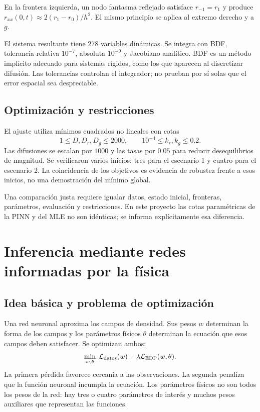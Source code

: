\documentclass[11pt,a4paper]{report}
\begin{document}
En la frontera izquierda, un nodo fantasma reflejado satisface $r_{-1}=r_1$ y produce $r_{xx}(0,t)\approx2(r_1-r_0)/h^2$. El mismo principio se aplica al extremo derecho y a $g$.

El sistema resultante tiene $278$ variables dinámicas. Se integra con BDF, tolerancia relativa $10^{-7}$, absoluta $10^{-9}$ y Jacobiano analítico. BDF es un método implícito adecuado para sistemas rígidos, como los que aparecen al discretizar difusión. Las tolerancias controlan el integrador; no prueban por sí solas que el error espacial sea despreciable.

\section{Optimización y restricciones}
El ajuste utiliza mínimos cuadrados no lineales con cotas
\[
1\le D,D_r,D_g\le2000,\qquad 10^{-4}\le k_r,k_g\le0.2.
\]
Las difusiones se escalan por $1000$ y las tasas por $0.05$ para reducir desequilibrios de magnitud. Se verificaron varios inicios: tres para el escenario 1 y cuatro para el escenario 2. La coincidencia de los objetivos es evidencia de robustez frente a esos inicios, no una demostración del mínimo global.

Una comparación justa requiere igualar datos, estado inicial, fronteras, parámetros, evaluación y restricciones. En este proyecto las cotas paramétricas de la PINN y del MLE no son idénticas; se informa explícitamente esa diferencia.

\chapter{Inferencia mediante redes informadas por la física}
\section{Idea básica y problema de optimización}
Una red neuronal aproxima los campos de densidad. Sus pesos $w$ determinan la forma de los campos y los parámetros físicos $\theta$ determinan la ecuación que esos campos deben satisfacer. Se optimizan ambos:
\[
\min_{w,\theta}\;\mathcal L_{\rm datos}(w)+\lambda\mathcal L_{\rm EDP}(w,\theta).
\]
La primera pérdida favorece cercanía a las observaciones. La segunda penaliza que la función neuronal incumpla la ecuación. Los parámetros físicos no son todos los pesos de la red: hay tres o cuatro parámetros de interés y muchos pesos auxiliares que representan las funciones.
\end{document}
